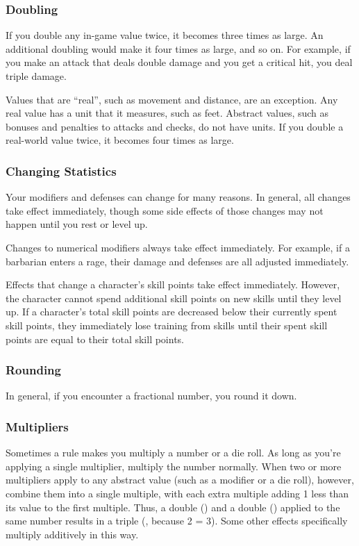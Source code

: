         \subsubsection{Doubling}\label{Doubling}
            If you double any in-game value twice, it becomes three times as large. An additional doubling would make it four times as large, and so on. For example, if you make an attack that deals double damage and you get a critical hit, you deal triple damage.

             Values that are ``real'', such as movement and distance, are an exception.
            Any real value has a unit that it measures, such as feet.
            Abstract values, such as bonuses and penalties to attacks and checks, do not have units.
            If you double a real-world value twice, it becomes four times as large.

        \subsubsection{Changing Statistics}

            Your modifiers and defenses can change for many reasons.
            In general, all changes take effect immediately, though some side effects of those changes may not happen until you rest or level up.

             Changes to numerical modifiers always take effect immediately.
            For example, if a barbarian enters a rage, their damage and defenses are all adjusted immediately.

             Effects that change a character's skill points take effect immediately.
            However, the character cannot spend additional skill points on new skills until they level up.
            If a character's total skill points are decreased below their currently spent skill points, they immediately lose training from skills until their spent skill points are equal to their total skill points.

        \subsubsection{Rounding}
            In general, if you encounter a fractional number, you round it down.

        \subsubsection{Multipliers}
            Sometimes a rule makes you multiply a number or a die roll.
            As long as you're applying a single multiplier, multiply the number normally.
            When two or more multipliers apply to any abstract value (such as a modifier or a die roll), however, combine them into a single multiple, with each extra multiple adding 1 less than its value to the first multiple.
            Thus, a double () and a double () applied to the same number results in a triple (, because 2  = 3).
            Some other effects specifically multiply additively in this way.

